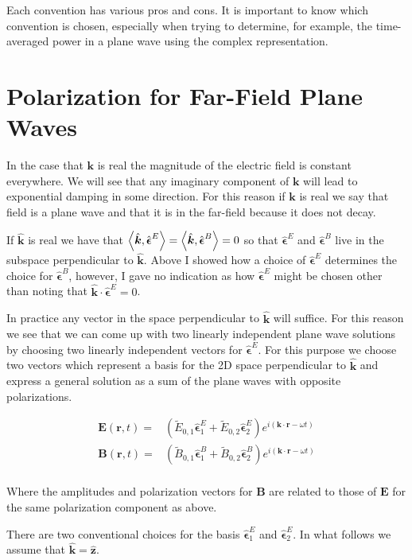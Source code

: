 \documentclass[12pt]{article}
\newcommand{\ep}{\epsilon}
\renewcommand{\vec}[1]{\boldsymbol{#1}}
\newcommand{\unitvec}[1]{\hat{\boldsymbol{#1}}}
\begin{document}
Each convention has various pros and cons.
It is important to know which convention is chosen, especially when trying to determine, for example, the time-averaged power in a plane wave using the complex representation.


\section{Polarization for Far-Field Plane Waves}

In the case that $\vec{k}$ is real the magnitude of the electric field is constant everywhere. 
We will see that any imaginary component of $\vec{k}$ will lead to exponential damping in some direction.
For this reason if $\vec{k}$ is real we say that field is a plane wave and that it is in the far-field because it does not decay.

If $\unitvec{k}$ is real we have that $\Braket{\unitvec{k},\unitvec{\ep}^E} = \Braket{\unitvec{k},\unitvec{\ep}^B}=0$ so that $\unitvec{\ep}^E$ and $\unitvec{\ep}^B$ live in the subspace perpendicular to $\unitvec{k}$.
Above I showed how a choice of $\unitvec{\ep}^E$ determines the choice for $\unitvec{\ep}^B$, however, I gave no indication as how $\unitvec{\ep}^E$ might be chosen other than noting that $\unitvec{k}\cdot\unitvec{\ep}^E = 0$.

In practice any vector in the space perpendicular to $\unitvec{k}$ will suffice.
For this reason we see that we can come up with two linearly independent plane wave solutions by choosing two linearly independent vectors for $\unitvec{\ep}^E$.
For this purpose we choose two vectors which represent a basis for the 2D space perpendicular to $\unitvec{k}$ and express a general solution as a sum of the plane waves with opposite polarizations.

\begin{align}
\vec{E}(\vec{r},t) =& \left(\tilde{E}_{0,1} \unitvec{\ep}^E_1 + \tilde{E}_{0,2}\unitvec{\ep}^E_2\right)e^{i(\vec{k}\cdot\vec{r} - \omega t)}\\
\vec{B}(\vec{r},t) =& \left(\tilde{B}_{0,1} \unitvec{\ep}^B_1 + \tilde{B}_{0,2}\unitvec{\ep}^B_2\right)e^{i(\vec{k}\cdot\vec{r} - \omega t)}\\
\end{align}

Where the amplitudes and polarization vectors for $\vec{B}$ are related to those of $\vec{E}$ for the same polarization component as above.

There are two conventional choices for the basis $\unitvec{\ep}^E_1$ and $\unitvec{\ep}^E_2$.
In what follows we assume that $\unitvec{k} = \unitvec{z}$.
\end{document}
